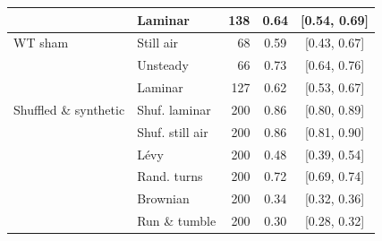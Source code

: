 \begin{table}[ht]
\begin{tabular}{llrcc}
 & Laminar & 138 & 0.64 & [0.54, 0.69] \\
\hline
WT sham & Still air & 68 & 0.59 & [0.43, 0.67] \\
 & Unsteady & 66 & 0.73 & [0.64, 0.76] \\
 & Laminar & 127 & 0.62 & [0.53, 0.67] \\
\hline
Shuffled \& synthetic & Shuf. laminar & 200 & 0.86 & [0.80, 0.89] \\
 & Shuf. still air & 200 & 0.86 & [0.81, 0.90] \\
 & L\'evy & 200 & 0.48 & [0.39, 0.54] \\
 & Rand. turns & 200 & 0.72 & [0.69, 0.74] \\
 & Brownian & 200 & 0.34 & [0.32, 0.36] \\
 & Run \& tumble & 200 & 0.30 & [0.28, 0.32] \\
\hline
\end{tabular}
\end{table}
